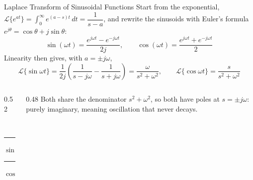 \documentclass[12pt, aspectratio=169]{beamer}
\begin{document}
\begin{frame}{Laplace Transform of Sinusoidal Functions}
    Start from the exponential,
    $\mathcal{L}\{e^{at}\} = \int_{0}^{\infty}\! e^{(a-s)t}\,dt = \dfrac{1}{s-a}$,
    and rewrite the sinusoids with Euler's formula $e^{j\theta} = \cos\theta + j\sin\theta$:
    \[
        \sin(\omega t) = \frac{e^{j\omega t} - e^{-j\omega t}}{2j}, \qquad
        \cos(\omega t) = \frac{e^{j\omega t} + e^{-j\omega t}}{2}
    \]
    Linearity then gives, with $a = \pm j\omega$,
    \[
        \mathcal{L}\{\sin \omega t\}
        = \frac{1}{2j}\left(\frac{1}{s-j\omega} - \frac{1}{s+j\omega}\right)
        = \frac{\omega}{s^2 + \omega^2},
        \qquad
        \mathcal{L}\{\cos \omega t\} = \frac{s}{s^2 + \omega^2}
    \]
    \begin{columns}
        \begin{column}{0.52\textwidth}
            \centering
            \\[-2pt]
            {\small \textcolor{red}{\rule{1em}{1.2pt}} $\sin\omega t$ \quad
             \textcolor{blue}{\rule{1em}{1.2pt}} $\cos\omega t$}
        \end{column}
        \begin{column}{0.48\textwidth}
            \small
            Both share the denominator $s^2+\omega^2$, so both have poles at
            $s = \pm j\omega$: purely imaginary, meaning \alert{oscillation that never decays}.
        \end{column}
    \end{columns}
\end{frame}
\end{document}
